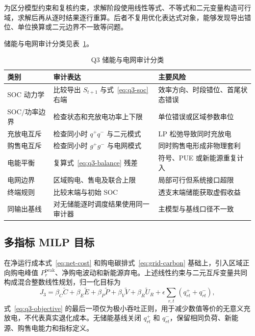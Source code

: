 为区分模型约束和复核约束，求解阶段使用线性等式、不等式和二元变量构造可行域，求解后再从逐时结果逐行重算。后者不复用优化表达式对象，能够发现导出错位、单位换算或二元边界不一致等问题。

储能与电网审计分类见表~\ref{tab:q3-audit-classes}。

\begin{table}[H]
  \centering
  \caption{Q3 储能与电网审计分类}
  \label{tab:q3-audit-classes}
  \small
  \begin{tabularx}{\textwidth}{p{}p{}X}
    \toprule
    类别 & 审计表达 & 主要风险 \\
    \midrule
    SOC 动力学 & 比较导出 $S_{t+1}$ 与式~\eqref{eq:q3-soc} 右端 & 效率方向、时段错位、首尾状态错误 \\
    SOC/功率边界 & 检查状态和充放电功率上下限 & 单位错误或区域参数串位 \\
    充放电互斥 & 检查同小时 $q^+q^-$ 与二元模式 & LP 松弛导致同时充放电 \\
    购售电互斥 & 检查同小时 $g^+g^-$ 与电网模式 & 同时购售电形成非物理套利 \\
    电能平衡 & 复算式~\eqref{eq:q3-balance} 残差 & 符号、PUE 或新能源重复计入 \\
    电网边界 & 区域购电、售电及联合上限 & 局部可行但系统接口超限 \\
    终端规则 & 比较末端与初始 SOC & 透支末端储能获取虚假收益 \\
    同输出基线 & 对无储能逐时调度结果使用同一审计器 & 主模型与基线口径不一致 \\
    \bottomrule
  \end{tabularx}
\end{table}

\subsection{多指标 MILP 目标}

在净运行成本式~\eqref{eq:net-cost} 和购电碳排式~\eqref{eq:grid-carbon} 基础上，引入区域正向购电峰值 $P_r^{\mathrm{peak}}$、净购电波动和新能源弃电。上述线性约束与二元互斥变量共同构成混合整数线性规划，归一化目标为
\begin{equation}
  J_3=\beta_C\widetilde C+\beta_E\widetilde E+\beta_P\widetilde P
  +\beta_V\widetilde V+\beta_R\widetilde U_R+\epsilon\sum_{r,t}(q^+_{rt}+q^-_{rt}),
  \label{eq:q3-objective}
\end{equation}
式~\eqref{eq:q3-objective} 的最后一项仅为极小吞吐正则，用于减少数值等价的无意义充放电，不代表真实退化成本。无储能基线关闭 $q^+_{rt}$ 和 $q^-_{rt}$，保留相同负荷、新能源、购售电能力和指标定义。

